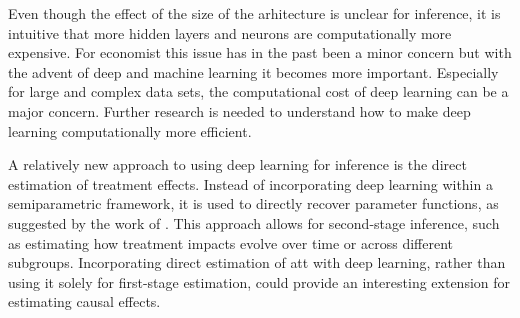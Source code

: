 Even though the effect of the size of the arhitecture is unclear for inference, it is intuitive that more hidden layers and neurons are computationally more expensive.
For economist this issue has in the past been a minor concern but with the advent of deep and machine learning it becomes more important.
Especially for large and complex data sets, the computational cost of deep learning can be a major concern.
Further research is needed to understand how to make deep learning computationally more efficient.

A relatively new approach to using deep learning for inference is the direct estimation of treatment effects.
Instead of incorporating deep learning within a semiparametric framework, it is used to directly recover parameter functions, as suggested by the work of \citet{DeepLearningIndividual2021}.
This approach allows for second-stage inference, such as estimating how treatment impacts evolve over time or across different subgroups.
Incorporating direct estimation of \ac{att} with deep learning, rather than using it solely for first-stage estimation, could provide an interesting extension for estimating causal effects.
